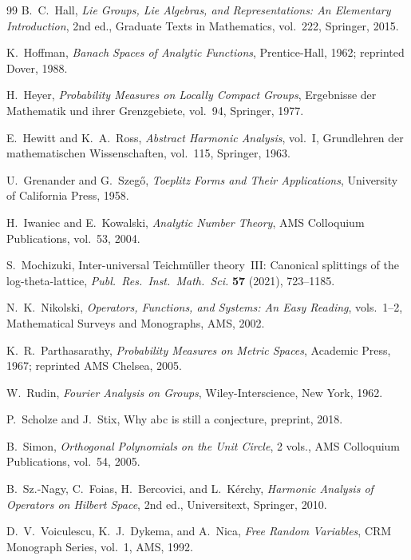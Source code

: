 \documentclass[12pt]{amsart}
\theoremstyle{definition}
\theoremstyle{remark}
\begin{document}
\begin{thebibliography}{99}
B.~C.~Hall,
\emph{Lie Groups, Lie Algebras, and Representations: An Elementary Introduction}, 2nd ed.,
Graduate Texts in Mathematics, vol.~222, Springer, 2015.

K.~Hoffman,
\emph{Banach Spaces of Analytic Functions},
Prentice-Hall, 1962; reprinted Dover, 1988.

H.~Heyer,
\emph{Probability Measures on Locally Compact Groups},
Ergebnisse der Mathematik und ihrer Grenzgebiete, vol.~94, Springer, 1977.

E.~Hewitt and K.~A.~Ross,
\emph{Abstract Harmonic Analysis}, vol.~I,
Grundlehren der mathematischen Wissenschaften, vol.~115, Springer, 1963.

U.~Grenander and G.~Szeg\H{o},
\emph{Toeplitz Forms and Their Applications},
University of California Press, 1958.

H.~Iwaniec and E.~Kowalski,
\emph{Analytic Number Theory},
AMS Colloquium Publications, vol.~53, 2004.

S.~Mochizuki,
Inter-universal Teichm\"uller theory~III: Canonical splittings of the log-theta-lattice,
\emph{Publ.\ Res.\ Inst.\ Math.\ Sci.} \textbf{57} (2021), 723--1185.

N.~K.~Nikolski,
\emph{Operators, Functions, and Systems: An Easy Reading}, vols.~1--2,
Mathematical Surveys and Monographs, AMS, 2002.

K.~R.~Parthasarathy,
\emph{Probability Measures on Metric Spaces},
Academic Press, 1967; reprinted AMS Chelsea, 2005.

W.~Rudin,
\emph{Fourier Analysis on Groups},
Wiley-Interscience, New York, 1962.

P.~Scholze and J.~Stix,
Why abc is still a conjecture,
preprint, 2018.

B.~Simon,
\emph{Orthogonal Polynomials on the Unit Circle}, 2 vols.,
AMS Colloquium Publications, vol.~54, 2005.

B.~Sz.-Nagy, C.~Foias, H.~Bercovici, and L.~K\'erchy,
\emph{Harmonic Analysis of Operators on Hilbert Space}, 2nd ed.,
Universitext, Springer, 2010.

D.~V.~Voiculescu, K.~J.~Dykema, and A.~Nica,
\emph{Free Random Variables},
CRM Monograph Series, vol.~1, AMS, 1992.

\end{thebibliography}
\end{document}
